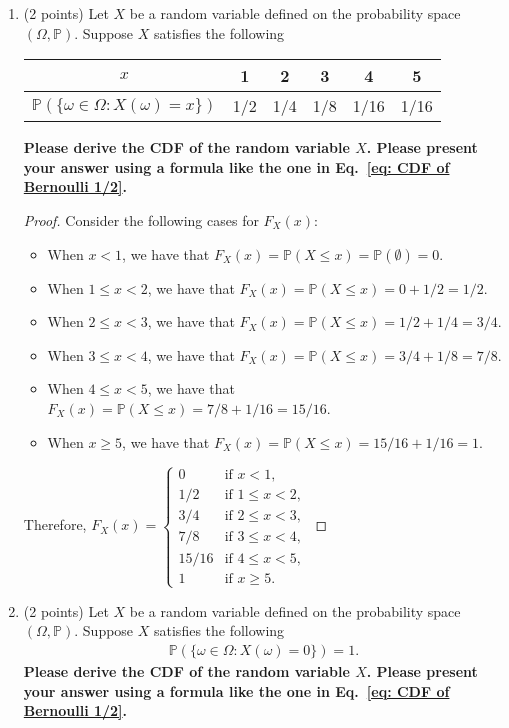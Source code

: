 \documentclass[11pt]{article}
\newcommand{\p}{\mathbb{P}}
\begin{document}
\begin{enumerate}
\item (2 points) Let $X$ be a random variable defined on the probability space $(\Omega,\mathbb{P})$. Suppose $X$ satisfies the following
\begin{table}[h]
\centering
\begin{tabular}{c|ccccc} \hline
$x$ & 1 & 2 & 3 & 4 & 5 \\\hline
$\mathbb{P}(\{\omega\in\Omega: X(\omega)=x\})$ & 1/2 & 1/4 & 1/8 & 1/16 & 1/16 \\\hline
\end{tabular}
\end{table}

\textbf{Please derive the CDF of the random variable $X$. Please present your answer using a formula like the one in Eq.~\eqref{eq: CDF of Bernoulli 1/2}.}

\begin{proof}
    Consider the following cases for \(F_X(x)\):
    \begin{itemize}
        \item When \(x<1\), we have that \(F_X(x)=\p(X\leq x)=\p(\emptyset)=0\).
        \item When \(1\leq x<2\), we have that \(F_X(x)=\p(X\leq x)=0+1/2 = 1/2\).
        \item When \(2\leq x<3\), we have that \(F_X(x)=\p(X\leq x)=1/2 + 1/4 = 3/4\).
        \item When \(3\leq x<4\), we have that \(F_X(x)=\p(X\leq x)=3/4+1/8=7/8\).
        \item When \(4\leq x<5\), we have that \(F_X(x)=\p(X\leq x)=7/8+1/16=15/16\).
        \item When \(x\geq 5\), we have that \(F_X(x)=\p(X\leq x)=15/16+1/16=1\).
    \end{itemize}
    Therefore, \(F_X(x)=
    \begin{cases}
        0 & \text{if } x<1,\\
        1/2 & \text{if } 1\leq x<2,\\
        3/4 & \text{if } 2\leq x<3,\\
        7/8 & \text{if } 3\leq x<4,\\
        15/16 & \text{if } 4\leq x<5,\\
        1 & \text{if } x\geq 5.
    \end{cases}\)
\end{proof}

\item (2 points) Let $X$ be a random variable defined on the probability space $(\Omega,\mathbb{P})$. Suppose $X$ satisfies the following
\begin{align*}
    \mathbb{P}(\{\omega\in\Omega: X(\omega)=0\})=1.
\end{align*}
\textbf{Please derive the CDF of the random variable $X$. Please present your answer using a formula like the one in Eq.~\eqref{eq: CDF of Bernoulli 1/2}.}



\end{enumerate}
\end{document}
